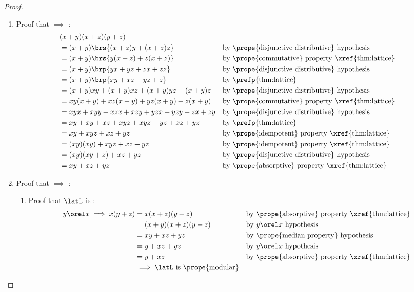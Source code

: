 \begin{proof}
\begin{enumerate}
  \item Proof that  $\implies$ : %
    \begin{align*}
      &(x+y)(x+z)(y+z)
      \\&= (x+y)\brs{(x+z)y+(x+z)z}
        && \text{by \prope{disjunctive distributive} hypothesis}
      \\&= (x+y)\brs{y(x+z)+z(x+z)}
        && \text{by \prope{commutative} property \xref{thm:lattice}}
      \\&= (x+y)\brp{yx+yz+zx+zz}
        && \text{by \prope{disjunctive distributive} hypothesis}
      \\&= (x+y)\brp{xy+xz+yz+z}
        && \text{by \prefp{thm:lattice}}
      \\&= (x+y)xy+(x+y)xz+(x+y)yz+(x+y)z
        && \text{by \prope{disjunctive distributive} hypothesis}
      \\&= xy(x+y)+xz(x+y)+yz(x+y)+z(x+y)
        && \text{by \prope{commutative} property \xref{thm:lattice}}
      \\&= xyx+xyy+xzx+xzy+yzx+yzy+zx+zy
        && \text{by \prope{disjunctive distributive} hypothesis}
      \\&= xy+xy+xz+xyz+xyz+yz+xz+yz
        && \text{by \prefp{thm:lattice}}
      \\&= xy+xyz+xz+yz
        && \text{by \prope{idempotent} property \xref{thm:lattice}}
      \\&= (xy)(xy)+xyz+xz+yz
        && \text{by \prope{idempotent} property \xref{thm:lattice}}
      \\&= (xy)(xy+z)+xz+yz
        && \text{by \prope{disjunctive distributive} hypothesis}
      \\&= xy+xz+yz
        && \text{by \prope{absorptive} property \xref{thm:lattice}}
    \end{align*}

  \item Proof that  $\implies$ : %
    \begin{enumerate}
      \item Proof that $\latL$ is :\label{item:lat_dis_mod}
        \begin{align*}
          y\orel x \implies x(y+z)
            &= x(x+z)(y+z)
            && \text{by \prope{absorptive} property \xref{thm:lattice}}
          \\&= (x+y)(x+z)(y+z)
            && \text{by $y\orel x$ hypothesis}
          \\&= xy + xz + yz
            && \text{by \prope{median property} hypothesis}
          \\&= y + xz + yz
            && \text{by $y\orel x$ hypothesis}
          \\&= y + xz
            && \text{by \prope{absorptive} property \xref{thm:lattice}}
          \\&\implies \text{$\latL$ is \prope{modular}}
        \end{align*}


\end{enumerate}
\end{enumerate}
\end{proof}
